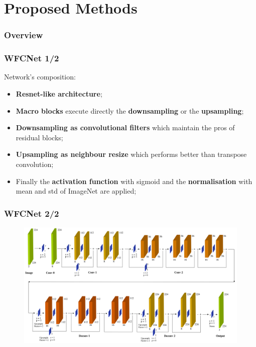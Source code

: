 \documentclass{beamer}
\begin{document}
\section{Proposed Methods}

\begin{frame}
\frametitle{Overview} 
	\tableofcontents[currentsection]
\end{frame}

\begin{frame}
\frametitle{WFCNet 1/2}

Network's composition:
\begin{itemize}
\item \textbf{Resnet-like architecture};
\item \textbf{Macro blocks} execute directly the \textbf{downsampling} or the \textbf{upsampling};
\item \textbf{Downsampling as convolutional filters} which maintain the pros of residual blocks;
\item \textbf{Upsampling as neighbour resize} which performs better than transpose convolution;
\item Finally the \textbf{activation function} with sigmoid and the \textbf{normalisation} with mean and std of ImageNet are applied;
\end{itemize}
 
\end{frame}

\begin{frame}
\frametitle{WFCNet 2/2}

\begin{figure}
\includegraphics[width=\textwidth]{./schemi/wfcnet_esploso}
\end{figure}
 
\end{frame}
\end{document}

